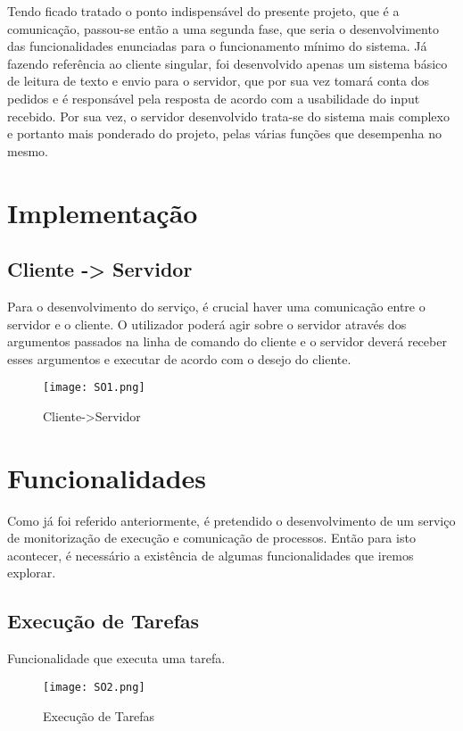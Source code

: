 \documentclass[a4paper]{article}
\begin{document}
Tendo ficado tratado o ponto indispensável do presente projeto, que é a comunicação, passou-se então a uma segunda fase, que seria o desenvolvimento das funcionalidades enunciadas para o funcionamento mínimo do sistema.
Já fazendo referência ao cliente singular, foi desenvolvido apenas um sistema básico de leitura de texto e envio para o servidor, que por sua vez tomará conta dos pedidos e é responsável pela resposta de acordo com a usabilidade do input recebido.
Por sua vez, o servidor desenvolvido trata-se do sistema mais complexo e portanto mais ponderado do projeto, pelas várias funções que desempenha no mesmo.



\pagebreak

\section{Implementação}
\label{sec:implementação}
\subsection{Cliente -> Servidor}
Para o desenvolvimento do serviço, é crucial haver uma comunicação entre o servidor e o cliente. O utilizador poderá agir sobre o servidor através dos argumentos passados na linha de comando do cliente e o servidor deverá receber esses argumentos e executar de acordo com o desejo do cliente.

\begin{figure}[H]
\centering
\texttt{[image: SO1.png]}
\caption{Cliente->Servidor}
\label{img:Ligação Cliente->Servidor}
\end{figure}

\section{Funcionalidades}
\label{sec:funcionalidades}
Como já foi referido anteriormente, é pretendido o desenvolvimento de um serviço de monitorização de execução e comunicação de processos. Então para isto acontecer, é necessário a existência de algumas funcionalidades que iremos explorar.
\subsection{\textbf{Execução de Tarefas}}
Funcionalidade que executa uma tarefa.
\begin{figure}[H]
\centering
\texttt{[image: SO2.png]}
\caption{Execução de Tarefas}
\label{img:Execução de Tarefas}
\end{figure}
\end{document}
